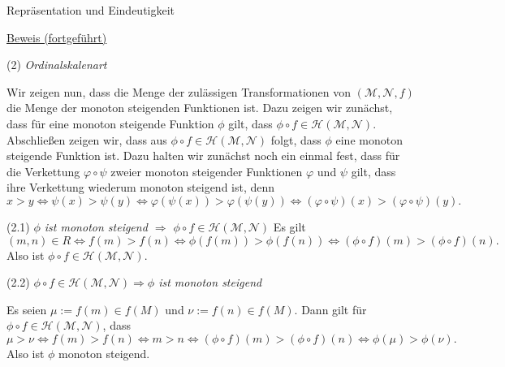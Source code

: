 \documentclass[
  8pt,
  ignorenonframetext,
]{beamer}
\begin{document}
\begin{frame}{Repräsentation und Eindeutigkeit}
\protect\hypertarget{repruxe4sentation-und-eindeutigkeit-7}{}
\footnotesize
\vspace{1mm}

\underline{Beweis (fortgeführt)}

\noindent (2) \emph{Ordinalskalenart}

Wir zeigen nun, dass die Menge der zulässigen Transformationen von
\((\mathcal{M},\mathcal{N},f)\) die Menge der monoton steigenden
Funktionen ist. Dazu zeigen wir zunächst, dass für eine monoton
steigende Funktion \(\phi\) gilt, dass
\(\phi \circ f \in \mathcal{H}(\mathcal{M}, \mathcal{N})\). Abschließen
zeigen wir, dass aus
\(\phi \circ f \in \mathcal{H}(\mathcal{M}, \mathcal{N})\) folgt, dass
\(\phi\) eine monoton steigende Funktion ist. Dazu halten wir zunächst
noch ein einmal fest, dass für die Verkettung \(\varphi \circ \psi\)
zweier monoton steigender Funktionen \(\varphi\) und \(\psi\) gilt, dass
ihre Verkettung wiederum monoton steigend ist, denn \begin{equation}
x > y \Leftrightarrow \psi(x) > \psi(y) \Leftrightarrow \varphi(\psi(x)) > \varphi(\psi(y))  \Leftrightarrow (\varphi \circ \psi) (x) > (\varphi \circ \psi) (y).
\end{equation}

(2.1) \emph{\(\phi\) ist monoton steigend \(\Rightarrow\)
\(\phi \circ f \in \mathcal{H}(\mathcal{M}, \mathcal{N})\)} Es gilt
\begin{equation}
(m,n) \in R \Leftrightarrow f(m) > f(n) \Leftrightarrow \phi(f(m)) > \phi(f(n)) \Leftrightarrow  (\phi \circ f)(m) >  (\phi \circ f)(n).
\end{equation} Also ist
\(\phi \circ f \in \mathcal{H}(\mathcal{M}, \mathcal{N})\).

(2.2)
\emph{\(\phi \circ f \in \mathcal{H}(\mathcal{M}, \mathcal{N}) \Rightarrow \phi\)
ist monoton steigend}

Es seien \(\mu := f(m) \in f(M)\) und \(\nu := f(n) \in f(M)\). Dann
gilt für \(\phi \circ f \in \mathcal{H}(\mathcal{M}, \mathcal{N})\),
dass \begin{equation}
\mu > \nu \Leftrightarrow f(m) > f(n) \Leftrightarrow m > n  \Leftrightarrow (\phi \circ f)(m) > (\phi \circ f)(n) \Leftrightarrow \phi(\mu) > \phi(\nu).
\end{equation} Also ist \(\phi\) monoton steigend.
\end{frame}
\end{document}
